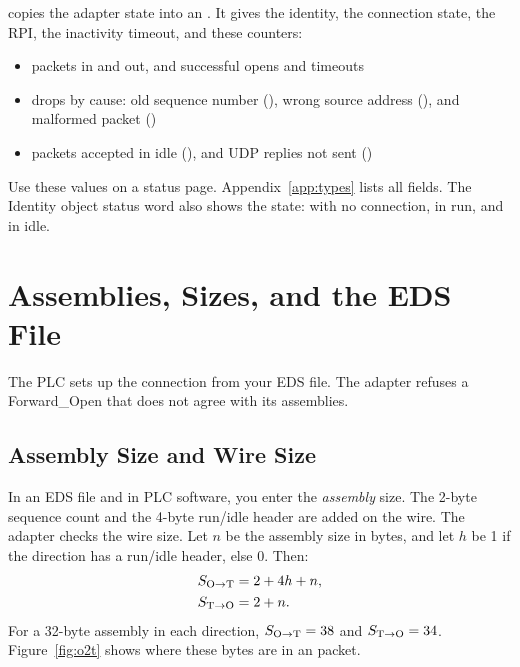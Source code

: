  copies the adapter state into an
. It gives the identity, the connection state, the RPI,
the inactivity timeout, and these counters:

\begin{itemize}
  \item packets in and out, and successful opens and timeouts
  \item drops by cause: old sequence number (), wrong
        source address (), and malformed packet
        ()
  \item packets accepted in idle (), and UDP replies not sent
        ()
\end{itemize}

Use these values on a status page. Appendix~\ref{app:types} lists all
fields. The Identity object status word also shows the state:
 with no connection,  in run, and  in idle.

\section{Assemblies, Sizes, and the EDS File}\label{sec:sizes}

The PLC sets up the connection from your EDS file. The adapter refuses a
Forward\_Open that does not agree with its assemblies.

\subsection{Assembly Size and Wire Size}

In an EDS file and in PLC software, you enter the \emph{assembly} size. The
2-byte sequence count and the 4-byte run/idle header are added on the wire.
The adapter checks the wire size. Let $n$ be the assembly size in bytes, and
let $h$ be 1 if the direction has a run/idle header, else 0. Then:
\begin{align}
  S_{\OT} &= 2 + 4h + n, \label{eq:o2t}\\
  S_{\TO} &= 2 + n. \label{eq:t2o}
\end{align}
For a 32-byte assembly in each direction, $S_{\OT} = 38$ and $S_{\TO} = 34$.
Figure~\ref{fig:o2t} shows where these bytes are in an \OT{} packet.

